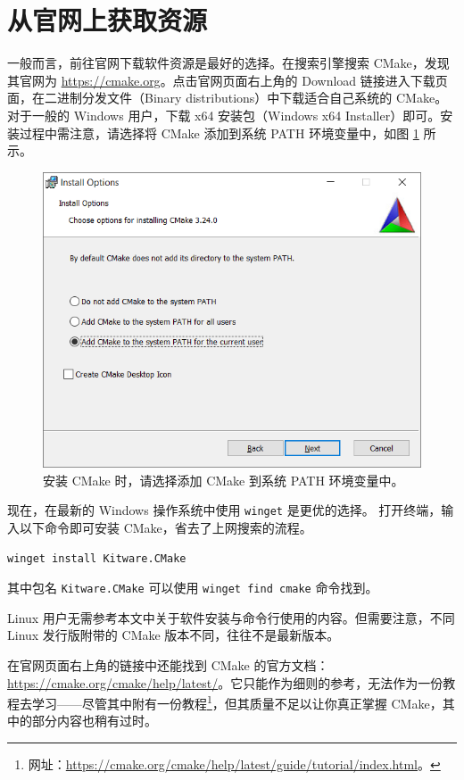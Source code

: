 
\section{从官网上获取资源}

一般而言，前往官网下载软件资源是最好的选择。在搜索引擎搜索 CMake，发现其官网为 \url{https://cmake.org}。点击官网页面右上角的 Download 链接进入下载页面，在二进制分发文件（Binary distributions）中下载适合自己系统的 CMake。对于一般的 Windows 用户，下载 x64 安装包（Windows x64 Installer）即可。安装过程中需注意，请选择将 CMake 添加到系统 PATH 环境变量中，如图 \ref{fig:cmake-installment} 所示。

\begin{figure}[H]
	\centering
	\includegraphics[width=0.6\linewidth]{assets/cmake-installment}
	\caption{安装 CMake 时，请选择添加 CMake 到系统 PATH 环境变量中。}
	\label{fig:cmake-installment}
\end{figure}

\begin{remark}
	现在，在最新的 Windows 操作系统中使用 \lstinline[language={}]{winget} 是更优的选择。
	打开终端，输入以下命令即可安装 CMake，省去了上网搜索的流程。

	\begin{lstlisting}[language={}, numbers=none]
winget install Kitware.CMake
	\end{lstlisting}

	其中包名 \lstinline[language={}]{Kitware.CMake} 可以使用 \lstinline[language={}]{winget find cmake} 命令找到。
\end{remark}

\bigskip

Linux 用户无需参考本文中关于软件安装与命令行使用的内容。但需要注意，不同 Linux 发行版附带的 CMake 版本不同，往往不是最新版本。

在官网页面右上角的链接中还能找到 CMake 的官方文档：\url{https://cmake.org/cmake/help/latest/}。它只能作为细则的参考，无法作为一份教程去学习——尽管其中附有一份教程\footnote{网址：\url{https://cmake.org/cmake/help/latest/guide/tutorial/index.html}。}，但其质量不足以让你真正掌握 CMake，其中的部分内容也稍有过时。
